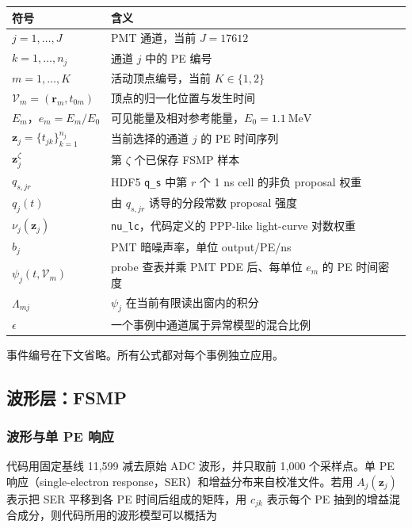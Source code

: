 \documentclass[UTF8,a4paper,11pt]{ctexart}
\begin{document}
\begin{longtable}[]{@{}L{0.27\textwidth}L{0.66\textwidth}@{}}
\toprule\noalign{}
符号 & 含义 \\
\midrule\noalign{}
\endhead
\bottomrule\noalign{}
\endlastfoot
\(j=1,\ldots,J\) & PMT 通道，当前 \(J=17612\) \\
\(k=1,\ldots,n_j\) & 通道 \(j\) 中的 PE 编号 \\
\(m=1,\ldots,K\) & 活动顶点编号，当前 \(K\in\{1,2\}\) \\
\(\mathcal V_m=(\mathbf r_m,t_{0m})\) & 顶点的归一化位置与发生时间 \\
\(E_m\)，\(e_m=E_m/E_0\) & 可见能量及相对参考能量，\(E_0=1.1\ \mathrm{MeV}\) \\
\(\mathbf z_j=\{t_{jk}\}_{k=1}^{n_j}\) & 当前选择的通道 \(j\) 的 PE 时间序列 \\
\(\mathbf z_j^\zeta\) & 第 \(\zeta\) 个已保存 FSMP 样本 \\
\(q_{s,jr}\) & HDF5 \texttt{q\_s} 中第 \(r\) 个 1 ns cell 的非负 proposal 权重 \\
\(q_j(t)\) & 由 \(q_{s,jr}\) 诱导的分段常数 proposal 强度 \\
\(\nu_j(\mathbf z_j)\) & \texttt{nu\_lc}，代码定义的 PPP-like light-curve 对数权重 \\
\(b_j\) & PMT 暗噪声率，单位 output/PE/ns \\
\(\psi_j(t,\mathcal V_m)\) & probe 查表并乘 PMT PDE 后、每单位 \(e_m\) 的 PE 时间密度 \\
\(\Lambda_{mj}\) & \(\psi_j\) 在当前有限读出窗内的积分 \\
\(\epsilon\) & 一个事例中通道属于异常模型的混合比例 \\
\end{longtable}

事件编号在下文省略。所有公式都对每个事例独立应用。

\subsection{波形层：FSMP}

\subsubsection{波形与单 PE 响应}

代码用固定基线 11,599 减去原始 ADC 波形，并只取前 1,000 个采样点。单 PE 响应（single-electron response，SER）和增益分布来自校准文件。若用 \(A_j(\mathbf z_j)\) 表示把 SER 平移到各 PE 时间后组成的矩阵，用 \(c_{jk}\) 表示每个 PE 抽到的增益混合成分，则代码所用的波形模型可以概括为
\end{document}
